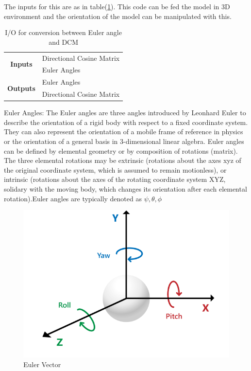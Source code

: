 The inputs for this are as in table(\ref{eadcm}). This code can be fed the model in 3D environment and the orientation of the model can be manipulated with this.
\begin{table}[H]
\centering
\begin{tabular}{@{}cl@{}}
\toprule
\multirow{2}{*}{\textbf{Inputs}}                      & Directional Cosine Matrix \\ \cmidrule(l){2-2} 
                                             & Euler Angles              \\ \midrule
\multicolumn{1}{r}{\multirow{2}{*}{\textbf{Outputs}}} & Euler Angles              \\ \cmidrule(l){2-2} 
\multicolumn{1}{r}{}                         & Directional Cosine Matrix \\ \bottomrule
\end{tabular}
\caption{I/O for conversion between Euler angle and DCM}
\label{eadcm}
\end{table}
Euler Angles:
	The Euler angles are three angles introduced by Leonhard Euler to describe the orientation of a rigid body with respect to a fixed coordinate system. They can also represent the orientation of a mobile frame of reference in physics or the orientation of a general basis in 3-dimensional linear algebra. Euler angles can be defined by elemental geometry or by composition of rotations (matrix).
	The three elemental rotations may be extrinsic (rotations about the axes xyz of the original coordinate system, which is assumed to remain motionless), or intrinsic (rotations about the axes of the rotating coordinate system XYZ, solidary with the moving body, which changes its orientation after each elemental rotation).Euler angles are typically denoted as $\psi, \theta, \phi$
\begin{figure}[H]
\includegraphics[scale=0.25]{images/EA1.png}
\caption{Euler Vector}
\end{figure}

